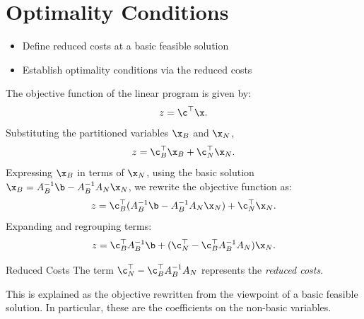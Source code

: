 \section{Optimality Conditions}
\begin{outcome}
\begin{itemize}
\item Define reduced costs at a basic feasible solution
\item Establish optimality conditions via the reduced costs
\end{itemize}
\end{outcome}
The objective function of the linear program is given by:
    \[
    z = \c^\top \x.
    \]
    Substituting the partitioned variables \( \x_B \) and \( \x_N \),
    \[
    z =\c_B^\top \x_B +\c_N^\top \x_N.
    \]
    Expressing \( \x_B \) in terms of \( \x_N \), using the basic solution \( \x_B = A_B^{-1}\b- A_B^{-1} A_N \x_N \), we rewrite the objective function as:
    \begin{equation}
    z =\c_B^\top (A_B^{-1}\b- A_B^{-1} A_N \x_N) +\c_N^\top \x_N.
    \end{equation}
    Expanding and regrouping terms:
    \begin{equation}
    z =\c_B^\top A_B^{-1}\b+  (\c_N^\top -\c_B^\top A_B^{-1} A_N )\x_N.
    \end{equation}
    \begin{definition}{Reduced Costs}{}{}
    The term \(\c_N^\top -\c_B^\top A_B^{-1} A_N \) represents the \emph{reduced costs}.  
    
    This is explained as the objective rewritten from the viewpoint of a basic feasible solution. In particular, these are the coefficients on the non-basic variables.
\end{definition}
    
